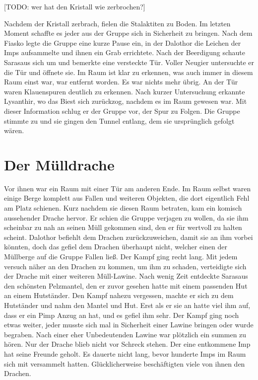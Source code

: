 \documentclass[10pt,twoside,twocolumn,openany]{book}
\begin{document}
	[TODO: wer hat den Kristall wie zerbrochen?]
	
	Nachdem der Kristall zerbrach, fielen die Stalaktiten zu Boden. Im letzten Moment schaffte es jeder aus der Gruppe sich in Sicherheit zu bringen. Nach dem Fiasko legte die Gruppe eine kurze Pause ein, in der Dalothor die Leichen der Imps aufsammelte und ihnen ein Grab errichtete. Nach der Beerdigung schaute Sarasaus sich um und bemerkte eine versteckte Tür. Voller Neugier untersuchte er die Tür und öffnete sie. Im Raum ist klar zu erkennen, was auch immer in diesem Raum einst war, war entfernt worden. Es war nichts mehr übrig. An der Tür waren Klauenspuren deutlich zu erkennen. Nach kurzer Untersuchung erkannte Lysanthir, wo das Biest sich zurückzog, nachdem es im Raum gewesen war. Mit dieser Information schlug er der Gruppe vor, der Spur zu Folgen. Die Gruppe stimmte zu und sie gingen den Tunnel entlang, dem sie ursprünglich gefolgt wären.
	
	\section{Der Mülldrache}
	
	Vor ihnen war ein Raum mit einer Tür am anderen Ende. Im Raum selbst waren einige Berge komplett aus Fallen und weiteren Objekten, die dort eigentlich Fehl am Platz schienen. Kurz nachdem sie diesen Raum betraten, kam ein komisch aussehender Drache hervor. Er schien die Gruppe verjagen zu wollen, da sie ihm scheinbar zu nah an seinen Müll gekommen sind, den er für wertvoll zu halten scheint. Dalothor befiehlt dem Drachen zurückzuweichen, damit sie an ihm vorbei könnten, doch das gefiel dem Drachen überhaupt nicht, welcher einen der Müllberge auf die Gruppe Fallen ließ. Der Kampf ging recht lang. Mit jedem versuch näher an den Drachen zu kommen, um ihm zu schaden, verteidigte sich der Drache mit einer weiteren Müll-Lawine. Nach wenig Zeit entdeckte Sarasaus den schönsten Pelzmantel, den er zuvor gesehen hatte mit einem passenden Hut an einem Hutständer. Den Kampf nahezu vergessen, machte er sich zu dem Hutständer und nahm den Mantel und Hut. Erst als er sie an hatte viel ihm auf, dass er ein Pimp Anzug an hat, und es gefiel ihm sehr. Der Kampf ging noch etwas weiter, jeder musste sich mal in Sicherheit einer Lawine bringen oder wurde begraben. Nach einer eher Unbedeutenden Lawine war plötzlich ein summen zu hören. Nur der Drache blieb nicht vor Schreck stehen. Der eine entkommene Imp hat seine Freunde geholt. Es dauerte nicht lang, bevor hunderte Imps im Raum sich mit versammelt hatten. Glücklicherweise beschäftigten viele von ihnen den Drachen. 
	
\end{document}
